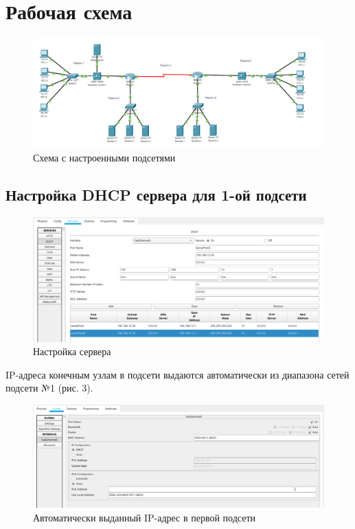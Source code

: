 \documentclass[12pt]{report}
\begin{document}
\section*{Рабочая схема}

\begin{figure}[H]
	\begin{center}
		\includegraphics[scale=0.42]{img/1.png}
	\end{center}
	\caption{Схема с настроенными подсетями}
	\label{fig:1}
\end{figure}

\subsection*{Настройка DHCP сервера для 1-ой подсети}

\begin{figure}[H]
	\begin{center}
		\includegraphics[scale=0.4]{img/2.png}
	\end{center}
	\caption{Настройка сервера}
	\label{fig:2}
\end{figure}

IP-адреса конечным узлам в подсети выдаются автоматически из диапазона сетей подсети №1 (рис. 3). 

\begin{figure}[H]
	\begin{center}
		\includegraphics[scale=0.4]{img/3.png}
	\end{center}
	\caption{Автоматически выданный IP-адрес в первой подсети}
	\label{fig:3}
\end{figure}
\end{document}
